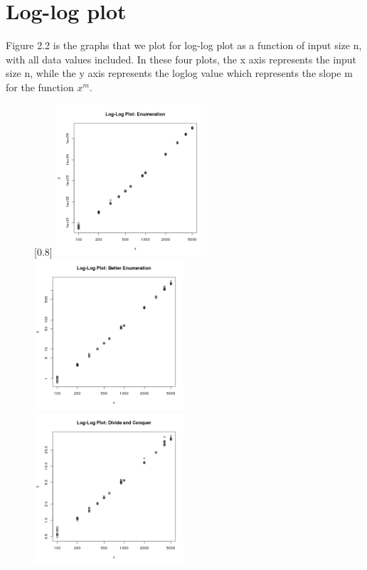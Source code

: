 \documentclass[11pt]{scrreprt}
\begin{document}
\section{Log-log plot}

Figure 2.2 is the graphs that we plot for log-log plot as a function of input size n, with all data values included. In these four plots, the x axis represents the input size n, while the y axis represents the loglog value which represents the slope m for the function $x^m$.

\begin{figure}
	\captionsetup{singlelinecheck=off}
	\captionsetup[subfigure]{singlelinecheck=on}
	[0.8\textwidth]{%
		\includegraphics[width=0.50\textwidth]{loglog_enumeration.png}%
		\includegraphics[width=0.50\textwidth]{loglog_better_enumeration.png}
		\includegraphics[width=0.50\textwidth]{loglog_divide_n_conquer.png}%
}
\end{figure}
\end{document}
